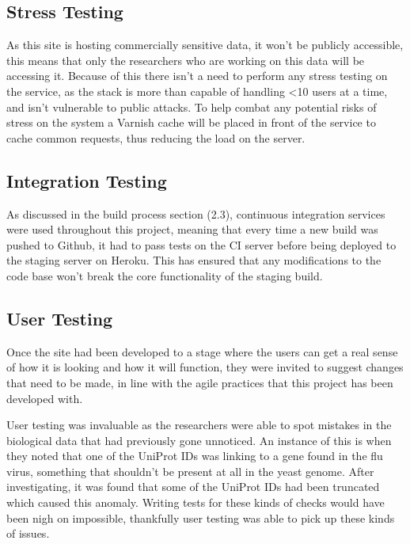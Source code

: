 \subsection{Stress Testing}
As this site is hosting commercially sensitive data, it won't be publicly accessible, this means that only the researchers who are working on this data will be accessing it. Because of this there isn't a need to perform any stress testing on the service, as the stack is more than capable of handling \textless 10 users at a time, and isn't vulnerable to public attacks. To help combat any potential risks of stress on the system a Varnish\cite{varnish} cache will be placed in front of the service to cache common requests, thus reducing the load on the server. 

\subsection{Integration Testing}
As discussed in the build process section (2.3), continuous integration services were used throughout this project, meaning that every time a new build was pushed to Github, it had to pass tests on the CI server before being deployed to the staging server on Heroku. This has ensured that any modifications to the code base won't break the core functionality of the staging build. 

\subsection{User Testing}
Once the site had been developed to a stage where the users can get a real sense of how it is looking and how it will function, they were invited to suggest changes that need to be made, in line with the agile practices that this project has been developed with. 

User testing was invaluable as the researchers were able to spot mistakes in the biological data that had previously gone unnoticed. An instance of this is when they noted that one of the UniProt IDs was linking to a gene found in the flu virus, something that shouldn't be present at all in the yeast genome. After investigating, it was found that some of the UniProt IDs had been truncated which caused this anomaly. Writing tests for these kinds of checks would have been nigh on impossible, thankfully user testing was able to pick up these kinds of issues. 
